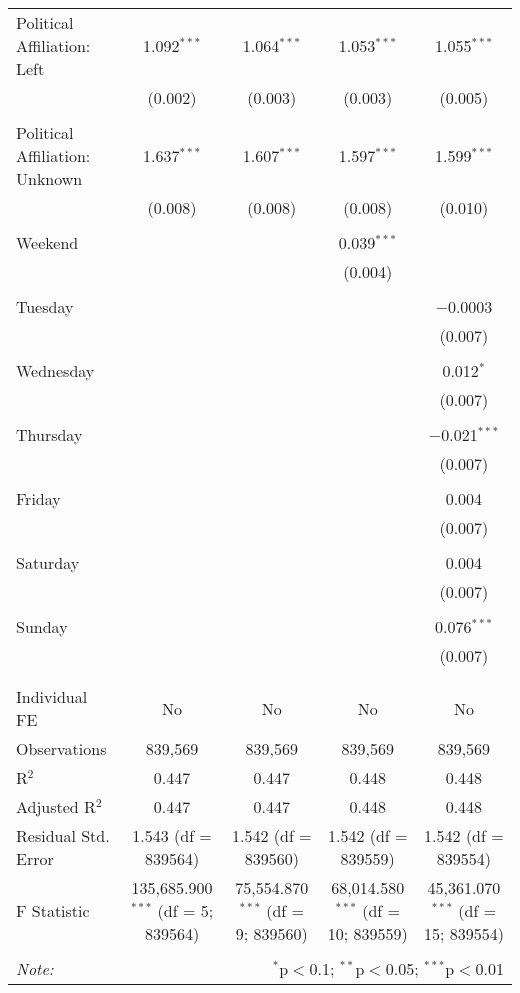 \documentclass[
]{article}
\begin{document}
\begin{table}[!htbp]
{\begin{tabular}{@{\extracolsep{5pt}}lcccc}
 Political Affiliation: Left & 1.092$^{***}$ & 1.064$^{***}$ & 1.053$^{***}$ & 1.055$^{***}$ \\ 
  & (0.002) & (0.003) & (0.003) & (0.005) \\ 
  & & & & \\ 
 Political Affiliation: Unknown & 1.637$^{***}$ & 1.607$^{***}$ & 1.597$^{***}$ & 1.599$^{***}$ \\ 
  & (0.008) & (0.008) & (0.008) & (0.010) \\ 
  & & & & \\ 
 Weekend &  &  & 0.039$^{***}$ &  \\ 
  &  &  & (0.004) &  \\ 
  & & & & \\ 
 Tuesday &  &  &  & $-$0.0003 \\ 
  &  &  &  & (0.007) \\ 
  & & & & \\ 
 Wednesday &  &  &  & 0.012$^{*}$ \\ 
  &  &  &  & (0.007) \\ 
  & & & & \\ 
 Thursday &  &  &  & $-$0.021$^{***}$ \\ 
  &  &  &  & (0.007) \\ 
  & & & & \\ 
 Friday &  &  &  & 0.004 \\ 
  &  &  &  & (0.007) \\ 
  & & & & \\ 
 Saturday &  &  &  & 0.004 \\ 
  &  &  &  & (0.007) \\ 
  & & & & \\ 
 Sunday &  &  &  & 0.076$^{***}$ \\ 
  &  &  &  & (0.007) \\ 
  & & & & \\ 
\hline \\[-1.8ex] 
Individual FE & No & No & No & No \\ 
Observations & 839,569 & 839,569 & 839,569 & 839,569 \\ 
R$^{2}$ & 0.447 & 0.447 & 0.448 & 0.448 \\ 
Adjusted R$^{2}$ & 0.447 & 0.447 & 0.448 & 0.448 \\ 
Residual Std. Error & 1.543 (df = 839564) & 1.542 (df = 839560) & 1.542 (df = 839559) & 1.542 (df = 839554) \\ 
F Statistic & 135,685.900$^{***}$ (df = 5; 839564) & 75,554.870$^{***}$ (df = 9; 839560) & 68,014.580$^{***}$ (df = 10; 839559) & 45,361.070$^{***}$ (df = 15; 839554) \\ 
\hline 
\hline \\[-1.8ex] 
\textit{Note:}  & \multicolumn{4}{r}{$^{*}$p$<$0.1; $^{**}$p$<$0.05; $^{***}$p$<$0.01} \\ 
\end{tabular}
} 
\end{table} 
\newpage
\end{document}
